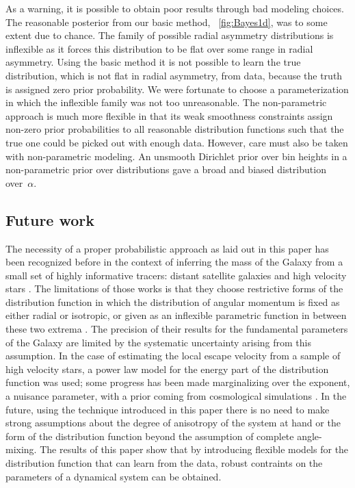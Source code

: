 As a warning, it is possible to obtain poor results through bad
modeling choices. The reasonable posterior from our basic method,
\figurename~\ref{fig:Bayes1d}, was to some extent due to chance. The
family of possible radial asymmetry distributions is inflexible as it
forces this distribution to be flat over some range in radial
asymmetry. Using the basic method it is not possible to learn the true
distribution, which is not flat in radial asymmetry, from data,
because the truth is assigned zero prior probability. We were
fortunate to choose a parameterization in which the inflexible family
was not too unreasonable. The non-parametric approach is much more
flexible in that its weak smoothness constraints assign non-zero prior
probabilities to all reasonable distribution functions such that the
true one could be picked out with enough data. However, care must also be
taken with non-parametric modeling. An unsmooth Dirichlet prior over
bin heights in a non-parametric prior over distributions gave a broad
and biased distribution over~$\alpha$.

\subsection{Future work}

The necessity of a proper probabilistic approach as laid out in this
paper has been recognized before in the context of inferring the mass
of the Galaxy from a small set of highly informative tracers: distant
satellite galaxies \citep{Little87a} and high velocity stars
\citep{Leonard90a}. The limitations of those works is that they choose
restrictive forms of the distribution function in which the
distribution of angular momentum is fixed as either radial or
isotropic, or given as an inflexible parametric function in
between these two extrema \citep{Kochanek96a}. The precision of their
results for the fundamental parameters of the Galaxy are limited by
the systematic uncertainty arising from this assumption. In the case
of estimating the local escape velocity from a sample of high velocity
stars, a power law model for the energy part of the distribution
function was used; some progress has been made marginalizing over the
exponent, a nuisance parameter, with a prior coming from cosmological
simulations \citep{Smith07a}. In the future, using the technique
introduced in this paper there is no need to make strong assumptions
about the degree of anisotropy of the system at hand or the form of
the distribution function beyond the assumption of complete
angle-mixing. The results of this paper show that by introducing
flexible models for the distribution function that can learn from the
data, robust contraints on the parameters of a dynamical system can be
obtained.

